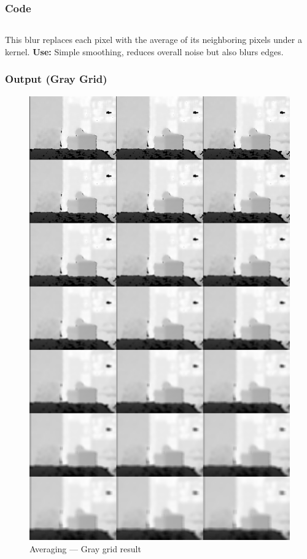 \documentclass[a4paper,11pt]{article}
\begin{document}
	\subsubsection*{Code}
	\inputminted{python}{Python_Files/04_average_blur.py}
	
	This blur replaces each pixel with the average of its neighboring pixels under a kernel.  
	\textbf{Use:} Simple smoothing, reduces overall noise but also blurs edges.
	

	
	\subsubsection*{Output (Gray Grid)}
	\begin{figure}[H]
		\centering
		\includegraphics[width=\textwidth,height=0.9\textheight,keepaspectratio]{Images/blur/04_average_gray_grid.png}
		\caption{Averaging — Gray grid result}
	\end{figure}
	\clearpage
	
\end{document}
